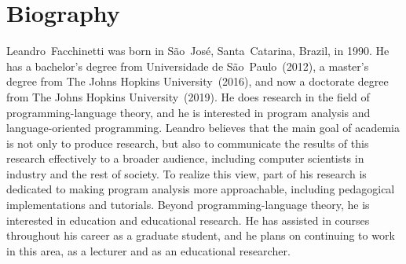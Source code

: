 \documentclass[12pt, oneside]{book}
\begin{document}
\chapter{Biography}

Leandro~Facchinetti was born in São~José, Santa~Catarina, Brazil, in 1990. He has a bachelor’s degree from Universidade de São~Paulo~(2012), a master’s degree from The Johns Hopkins University~(2016), and now a doctorate degree from The Johns Hopkins University~(2019). He does research in the field of programming-language theory, and he is interested in program analysis and language-oriented programming. Leandro believes that the main goal of academia is not only to produce research, but also to communicate the results of this research effectively to a broader audience, including computer scientists in industry and the rest of society. To realize this view, part of his research is dedicated to making program analysis more approachable, including pedagogical implementations and tutorials. Beyond programming-language theory, he is interested in education and educational research. He has assisted in courses throughout his career as a graduate student, and he plans on continuing to work in this area, as a lecturer and as an educational researcher.
\end{document}
